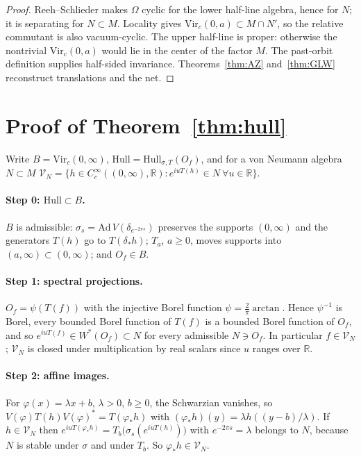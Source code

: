 \documentclass[12pt]{article}
\theoremstyle{definition}
\theoremstyle{remark}
\begin{document}
\begin{proof}
Reeh--Schlieder makes \(\Omega\) cyclic for the lower half-line algebra, hence
for \(N\); it is separating for \(N\subset M\). Locality gives
\(\mathrm{Vir}_c(0,a)\subset M\cap N'\), so the relative commutant is also
vacuum-cyclic. The upper half-line is proper: otherwise the nontrivial
\(\mathrm{Vir}_c(0,a)\) would lie in the center of the factor \(M\).
The past-orbit definition supplies half-sided invariance.
Theorems~\ref{thm:AZ} and~\ref{thm:GLW} reconstruct translations and the net.
\end{proof}

\section{Proof of Theorem~\ref{thm:hull}}\label{app:hull}

Write \(B=\mathrm{Vir}_c(0,\infty)\), \(\mathrm{Hull}=\mathrm{Hull}_{\sigma,T}(O_f)\), and for a
von Neumann algebra \(N\subset M\)
\(\mathcal V_N=\{h\in C_c^\infty((0,\infty),\mathbb R):e^{iuT(h)}\in N\ \forall u\in\mathbb R\}\).

\paragraph{Step 0: \(\mathrm{Hull}\subset B\).} \(B\) is admissible: \(\sigma_s=\mathrm{Ad}\,V(\delta_{e^{-2\pi s}})\) preserves
the supports \((0,\infty)\) and the generators \(T(h)\) go to \(T(\delta_*h)\); \(T_a\), \(a\ge0\),
moves supports into \((a,\infty)\subset(0,\infty)\); and \(O_f\in B\).

\paragraph{Step 1: spectral projections.} \(O_f=\psi(T(f))\) with the injective Borel function
\(\psi=\tfrac2\pi\arctan\). Hence \(\psi^{-1}\) is Borel, every bounded Borel function of
\(T(f)\) is a bounded Borel function of \(O_f\), and so \(e^{iuT(f)}\in W^*(O_f)\subset N\)
for every admissible \(N\ni O_f\). In particular \(f\in\mathcal V_N\); \(\mathcal V_N\) is
closed under multiplication by real scalars since \(u\) ranges over \(\mathbb R\).

\paragraph{Step 2: affine images.} For \(\varphi(x)=\lambda x+b\), \(\lambda>0\), \(b\ge0\), the Schwarzian
vanishes, so \(V(\varphi)T(h)V(\varphi)^*=T(\varphi_*h)\) with
\((\varphi_*h)(y)=\lambda h((y-b)/\lambda)\). If \(h\in\mathcal V_N\) then
\(e^{iuT(\varphi_*h)}=T_b\big(\sigma_s(e^{iuT(h)})\big)\) with \(e^{-2\pi s}=\lambda\)
belongs to \(N\), because \(N\) is stable under \(\sigma\) and under \(T_b\). So
\(\varphi_*h\in\mathcal V_N\).
\end{document}
